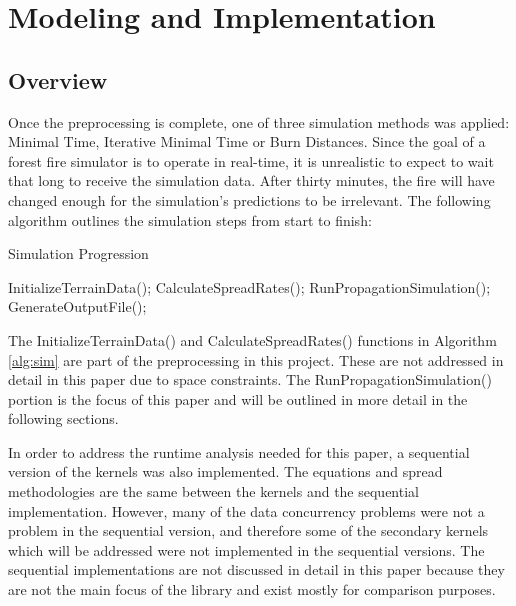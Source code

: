 \chapter{Modeling and Implementation}
\label{chapter:implementation}

\section{Overview}

Once the preprocessing is complete, one of three simulation methods was applied: Minimal Time, Iterative Minimal Time or Burn Distances. Since the goal of a forest fire simulator is to operate in real-time, it is unrealistic to expect to wait that long to receive the simulation data. After thirty minutes, the fire will have changed enough for the simulation's predictions to be irrelevant. The following algorithm outlines the simulation steps from start to finish:

\begin{algorithm}
  \caption{Simulation Progression}
  \label{alg:sim}
  \begin{algorithmic}
  \STATE InitializeTerrainData();
  \STATE CalculateSpreadRates();
  \STATE RunPropagationSimulation();
  \ENDWHILE  
  \STATE GenerateOutputFile();
  \end{algorithmic}
\end{algorithm}

The InitializeTerrainData() and CalculateSpreadRates() functions in Algorithm \ref{alg:sim} are part of the preprocessing in this project. These are not addressed in detail in this paper due to space constraints. The RunPropagationSimulation() portion is the focus of this paper and will be outlined in more detail in the following sections.

In order to address the runtime analysis needed for this paper, a sequential version of the kernels was also implemented. The equations and spread methodologies are the same between the kernels and the sequential implementation. However, many of the data concurrency problems were not a problem in the sequential version, and therefore some of the secondary kernels which will be addressed were not implemented in the sequential versions. The sequential implementations are not discussed in detail in this paper because they are not the main focus of the library and exist mostly for comparison purposes.  


